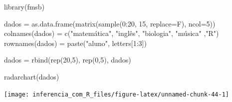 \documentclass[
]{book}
\newenvironment{Shaded}{\begin{snugshade}}{\end{snugshade}}
\newcommand{\AttributeTok}[1]{\textcolor[rgb]{0.77,0.63,0.00}{#1}}
\newcommand{\DecValTok}[1]{\textcolor[rgb]{0.00,0.00,0.81}{#1}}
\newcommand{\FunctionTok}[1]{\textcolor[rgb]{0.00,0.00,0.00}{#1}}
\newcommand{\NormalTok}[1]{#1}
\newcommand{\OtherTok}[1]{\textcolor[rgb]{0.56,0.35,0.01}{#1}}
\newcommand{\SpecialCharTok}[1]{\textcolor[rgb]{0.00,0.00,0.00}{#1}}
\newcommand{\StringTok}[1]{\textcolor[rgb]{0.31,0.60,0.02}{#1}}
\begin{document}
\begin{Shaded}
\begin{Highlighting}[]
\FunctionTok{library}\NormalTok{(fmsb)}

\NormalTok{dados }\OtherTok{=} \FunctionTok{as.data.frame}\NormalTok{(}\FunctionTok{matrix}\NormalTok{(}\FunctionTok{sample}\NormalTok{(}\DecValTok{0}\SpecialCharTok{:}\DecValTok{20}\NormalTok{, }\DecValTok{15}\NormalTok{, }\AttributeTok{replace=}\NormalTok{F), }\AttributeTok{ncol=}\DecValTok{5}\NormalTok{))}
\FunctionTok{colnames}\NormalTok{(dados) }\OtherTok{=} \FunctionTok{c}\NormalTok{(}\StringTok{"matemática"}\NormalTok{, }\StringTok{"inglês"}\NormalTok{, }\StringTok{"biologia"}\NormalTok{, }\StringTok{"música"}\NormalTok{ ,}\StringTok{"R"}\NormalTok{)}
\FunctionTok{rownames}\NormalTok{(dados) }\OtherTok{=} \FunctionTok{paste}\NormalTok{(}\StringTok{"aluno"}\NormalTok{, letters[}\DecValTok{1}\SpecialCharTok{:}\DecValTok{3}\NormalTok{])}

\NormalTok{dados }\OtherTok{=} \FunctionTok{rbind}\NormalTok{(}\FunctionTok{rep}\NormalTok{(}\DecValTok{20}\NormalTok{,}\DecValTok{5}\NormalTok{), }\FunctionTok{rep}\NormalTok{(}\DecValTok{0}\NormalTok{,}\DecValTok{5}\NormalTok{), dados)}
 
\FunctionTok{radarchart}\NormalTok{(dados)}
\end{Highlighting}
\end{Shaded}

\begin{center}\texttt{[image: inferencia\_com\_R\_files/figure-latex/unnamed-chunk-44-1]} \end{center}

  
\end{document}
